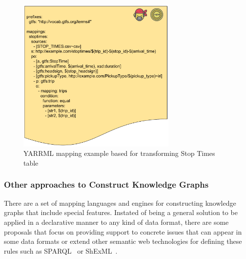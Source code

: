 \begin{figure}[!ht]
\centering
\includegraphics[width=0.7\textwidth]{figures/state-of-the-art/YARRRML example.pdf}
\caption{YARRML mapping example based for transforming Stop Times table}
\label{fig:soa_yarrrml}
\end{figure}

\subsubsection{Other approaches to Construct Knowledge Graphs}
There are a set of mapping languages and engines for constructing knowledge graphs that include special features. Instated of being a general solution to be applied in a declarative manner to any kind of data format, there are some proposals that focus on providing support to concrete issues that can appear in some data formats or extend other semantic web technologies for defining these rules such as SPARQL~\citep{SPARQL} or ShExML~\citep{prud2014shape}.  

